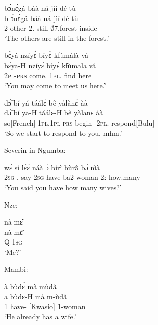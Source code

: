\begin{exe}[(C234)]
\exC\label{137}
  \glll  bɔ́nɛ́gá báà ná jìí dé tù \\
        b-ɔ́nɛ́gá báà ná jìí dé tù \\
          2-other 2.{\COP} still $\emptyset$7.forest {\LOC} inside  \\
    \trans `The others are still in the forest.'
 
\exC\label{138}
  \glll  bɛ̀yá nzíyɛ̀ bíyɛ̀ kfùmàlà vâ \\
         bɛ̀ya-H nzíyɛ̀ bíyɛ̀ kfùmala vâ \\
         2\textsc{pl}-\textsc{prs}  come.{\SBJV}  1\textsc{pl}.{\OBJ} find here   \\
    \trans `You may come to meet us here.'
 
\exC\label{139} 
  \glll  dɔ̃̀ bí yá táálɛ́ bê yàlànɛ̀ àà \\
        dɔ̃̀ bí ya-H táálɛ-H bê yàlanɛ àà \\
       so[French] 1\textsc{pl}.{\SBJ}1\textsc{pl}-\textsc{prs} begin-{\R} 2\textsc{pl}.{\OBJ} respond[Bulu] {\EXCL}   \\
    \trans `So we start to respond to you, mhm.'
\end{exe}

\noindent Severin in Ngumba:

\begin{exe}[(C234)]  
\exC\label{140} 
  \gll  wɛ̀ sí lɛ́ɛ̀ náà ɔ̀ bírì bùrã̂ bɔ̀ nìà \\
          2\textsc{sg} {\PROG}.{\PST}  say {\COMP} 2\textsc{sg} have ba2-woman 2:{\ATT}  how.many  \\
    \trans `You said you have how many wives?'
\end{exe}

\noindent Nze:

\begin{exe}[(C234)] 
\exC\label{141} 
  \glll  nà mɛ̂ \\
         nà mɛ̂ \\
          Q 1\textsc{sg}  \\
    \trans `Me?'
\end{exe}

\noindent Mambi:

\begin{exe}[(C234)] 
\exC\label{142}  
  \glll à bùdɛ́ mà mùdã̂ \\
        a bùdɛ-H mà m-ùdã̂ \\
          1 have-{\R} {\COMPL}[Kwasio] {\N}1-woman  \\
    \trans `He already has a wife.'
\end{exe}

